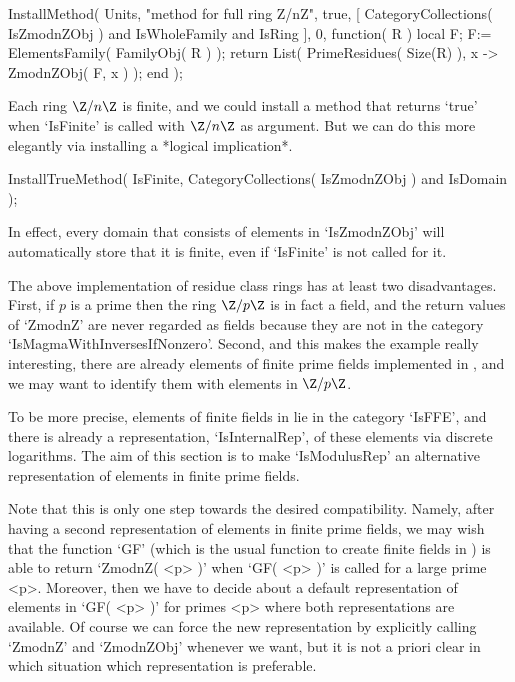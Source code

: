     InstallMethod( Units,
        "method for full ring Z/nZ",
        true,
        [     CategoryCollections( IsZmodnZObj )
          and IsWholeFamily and IsRing ], 0,
        function( R )
        local F;
        F:= ElementsFamily( FamilyObj( R ) );
        return List( PrimeResidues( Size(R) ), x -> ZmodnZObj( F, x ) );
        end );
\endtt

Each ring $\Z/n\Z$ is finite,
and we could install a method that returns `true' when `IsFinite' is
called with $\Z/n\Z$ as argument.
But we can do this more elegantly via installing a *logical implication*.

\begintt
    InstallTrueMethod( IsFinite,
        CategoryCollections( IsZmodnZObj ) and IsDomain );
\endtt

In effect, every domain that consists of elements in `IsZmodnZObj'
will automatically store that it is finite,
even if `IsFinite' is not called for it.



The above implementation of residue class rings has at least two
disadvantages.
First, if $p$ is a prime then the ring $\Z/p\Z$ is in fact a field,
and the return values of `ZmodnZ' are never regarded as fields because
they are not in the category `IsMagmaWithInversesIfNonzero'.
Second, and this makes the example really interesting,
there are already elements of finite prime fields implemented in {\GAP},
and we may want to identify them with elements in $\Z/p\Z$.

To be more precise,
elements of finite fields in {\GAP} lie in the category `IsFFE',
and there is already a representation, `IsInternalRep', of these elements
via discrete logarithms.
The aim of this section is to make `IsModulusRep' an alternative
representation of elements in finite prime fields.

Note that this is only one step towards the desired compatibility.
Namely, after having a second representation of elements in finite
prime fields, we may wish that the function `GF' (which is the usual
function to create finite fields in {\GAP}) is able to return
`ZmodnZ( <p> )' when `GF( <p> )' is called for a large prime <p>.
Moreover, then we have to decide about a default representation of
elements in `GF( <p> )' for primes <p> where both representations are
available.
Of course we can force the new representation by explicitly calling
`ZmodnZ' and `ZmodnZObj' whenever we want, but it is not a priori
clear in which situation which representation is preferable.

